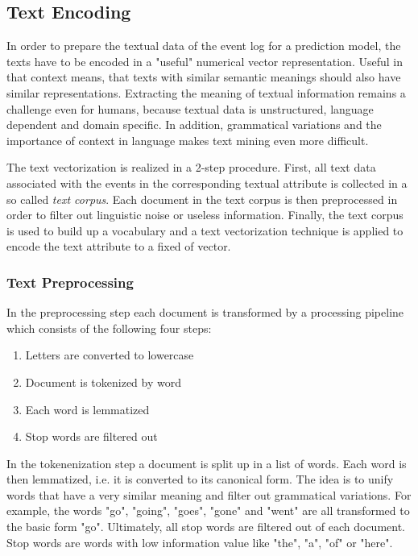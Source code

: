 \subsection{Text Encoding}

In order to prepare the textual data of the event log for a prediction model, the texts have to be encoded in a "useful" numerical vector representation.
Useful in that context means, that texts with similar semantic meanings should also have similar representations.
Extracting the meaning of textual information remains a challenge even for humans, because textual data is unstructured, language dependent and domain specific.
In addition, grammatical variations and the importance of context in language makes text mining even more difficult.

The text vectorization is realized in a 2-step procedure.
First, all text data associated with the events in the corresponding textual attribute is collected in a so called \textit{text corpus}.
Each document in the text corpus is then preprocessed in order to filter out linguistic noise or useless information.
Finally, the text corpus is used to build up a vocabulary and a text vectorization technique is applied to encode the text attribute to a fixed of vector.

\subsubsection{Text Preprocessing}

In the preprocessing step each document is transformed by a processing pipeline which consists of the following four steps:

\begin{enumerate} 
	\item Letters are converted to lowercase
	\item Document is tokenized by word
	\item Each word is lemmatized
	\item Stop words are filtered out
\end{enumerate}

In the tokenenization step a document is split up in a list of words.
Each word is then lemmatized, i.e. it is converted to its canonical form.
The idea is to unify words that have a very similar meaning and filter out grammatical variations.
For example, the words  "go", "going", "goes", "gone" and "went" are all transformed to the basic form "go".
Ultimately, all stop words are filtered out of each document.
Stop words are words with low information value like "the", "a", "of" or "here".

